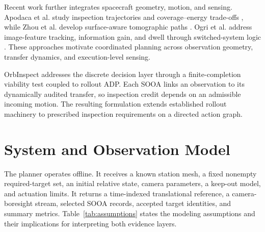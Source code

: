 \documentclass{IEEEtaes}
\theoremstyle{remark}
\theoremstyle{plain}
\begin{document}
Recent work further integrates spacecraft geometry, motion, and sensing. Apodaca et al. study inspection trajectories and coverage--energy trade-offs \cite{apodaca2025trajectory}, while Zhou et al. develop surface-aware tomographic paths \cite{zhou2026tomographic}. Ogri et al. address image-feature tracking, information gain, and dwell through switched-system logic \cite{ogri2025switched}. These approaches motivate coordinated planning across observation geometry, transfer dynamics, and execution-level sensing.

OrbInspect addresses the discrete decision layer through a finite-completion viability test coupled to rollout ADP. Each SOOA links an observation to its dynamically audited transfer, so inspection credit depends on an admissible incoming motion. The resulting formulation extends established rollout machinery to prescribed inspection requirements on a directed action graph.

\section{System and Observation Model}
\label{sec:system}

The planner operates offline. It receives a known station mesh, a fixed nonempty required-target set, an initial relative state, camera parameters, a keep-out model, and actuation limits. It returns a time-indexed translational reference, a camera-boresight stream, selected SOOA records, accepted target identities, and summary metrics. Table~\ref{tab:assumptions} states the modeling assumptions and their implications for interpreting both evidence layers.
\end{document}
